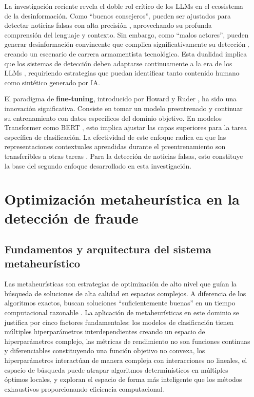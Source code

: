 La investigación reciente revela el doble rol crítico de los LLMs en el ecosistema de la desinformación. Como ``buenos consejeros'', pueden ser ajustados para detectar noticias falsas con alta precisión \cite{hu2024bad}, aprovechando su profunda comprensión del lenguaje y contexto. Sin embargo, como ``malos actores'', pueden generar desinformación convincente que complica significativamente su detección \cite{su2023fake}, creando un escenario de carrera armamentista tecnológica. Esta dualidad implica que los sistemas de detección deben adaptarse continuamente a la era de los LLMs \cite{su2023adapting}, requiriendo estrategias que puedan identificar tanto contenido humano como sintético generado por IA.

El paradigma de \textbf{fine-tuning}, introducido por Howard y Ruder \cite{howard2018universal}, ha sido una innovación significativa. Consiste en tomar un modelo preentrenado y continuar su entrenamiento con datos específicos del dominio objetivo. En modelos Transformer como BERT \cite{kenton2019bert}, esto implica ajustar las capas superiores para la tarea específica de clasificación. La efectividad de este enfoque radica en que las representaciones contextuales aprendidas durante el preentrenamiento son transferibles a otras tareas \cite{ruder2019neural}. Para la detección de noticias falsas, esto constituye la base del segundo enfoque desarrollado en esta investigación.

\section{Optimización metaheurística en la detección de fraude}
\label{sec:optimizacion_metaheuristica}

\subsection{Fundamentos y arquitectura del sistema metaheurístico}

Las metaheurísticas son estrategias de optimización de alto nivel que guían la búsqueda de soluciones de alta calidad en espacios complejos. A diferencia de los algoritmos exactos, buscan soluciones ``suficientemente buenas'' en un tiempo computacional razonable \cite{anselmo2013diseno}. La aplicación de metaheurísticas en este dominio se justifica por cinco factores fundamentales: los modelos de clasificación tienen múltiples hiperparámetros interdependientes creando un espacio de hiperparámetros complejo, las métricas de rendimiento no son funciones continuas y diferenciables constituyendo una función objetivo no convexa, los hiperparámetros interactúan de manera compleja con interacciones no lineales, el espacio de búsqueda puede atrapar algoritmos determinísticos en múltiples óptimos locales, y exploran el espacio de forma más inteligente que los métodos exhaustivos proporcionando eficiencia computacional.

